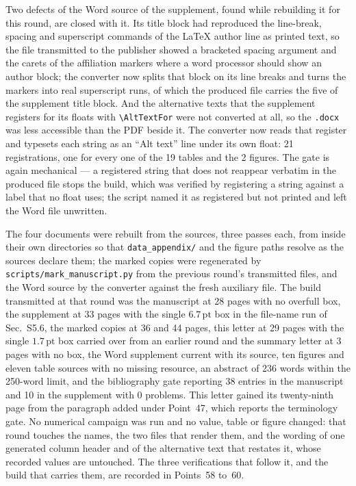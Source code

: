 \documentclass[11pt,a4paper]{article}
\begin{document}
Two defects of the Word source of the supplement, found while rebuilding it for this round,
are closed with it. Its title block had reproduced the line-break, spacing and superscript
commands of the \LaTeX{} author line as printed text, so the file transmitted to the
publisher showed a bracketed spacing argument and the carets of the affiliation markers
where a word processor should show an author block; the converter now splits that block on
its line breaks and turns the markers into real superscript runs, of which the produced
file carries the five of the supplement title block. And the
alternative texts that the supplement registers for its floats with
\texttt{\textbackslash AltTextFor} were not converted at all, so the \texttt{.docx} was less
accessible than the PDF beside it. The converter now reads that register and typesets each
string as an ``Alt text'' line under its own float: 21 registrations, one for every one of
the 19 tables and the 2 figures. The gate is again mechanical --- a registered string that
does not reappear verbatim in the produced file stops the build, which was verified by
registering a string against a label that no float uses; the script named it as registered
but not printed and left the Word file unwritten.

The four documents were rebuilt from the sources, three passes each, from inside their own
directories so that \texttt{data\_appendix/} and the figure paths resolve as the sources
declare them; the marked copies were regenerated by
\texttt{scripts/}\hspace{0pt}\texttt{mark\_manuscript.py} from the previous round's
transmitted files, and the Word source by the converter against the fresh auxiliary file.
The build transmitted at that round was the manuscript at 28 pages with no overfull box, the supplement at
33 pages with the single \(6.7\,\mathrm{pt}\) box in the file-name run of Sec.~S5.6, the
marked copies at 36 and 44 pages, this letter at 29 pages with the single
\(1.7\,\mathrm{pt}\) box carried over from an earlier round and the summary letter at 3
pages with no box, the Word supplement current with its source, ten figures and
eleven table sources with no missing resource, an abstract of 236 words within the 250-word
limit, and the bibliography gate reporting 38 entries in the manuscript and 10 in the
supplement with 0 problems. This letter gained its twenty-ninth page from the paragraph
added under Point~47, which reports the terminology gate. No numerical campaign was run and
no value, table or figure changed: that round touches the names, the two files that render
them, and the wording of one generated column header and of the alternative text that
restates it, whose recorded values are untouched. The three verifications that
follow it, and the build that carries them, are recorded in Points~58 to~60.
\end{document}
